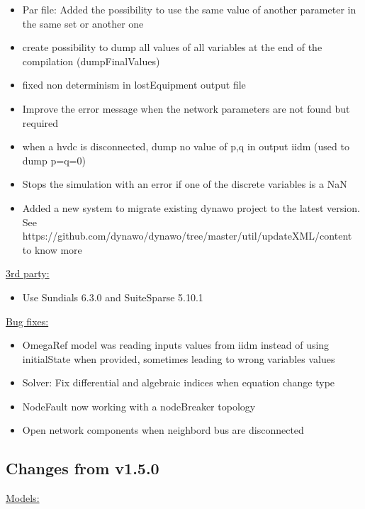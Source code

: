 \documentclass[a4paper, 12pt]{report}
\begin{document}
\begin{itemize}
\item Par file: Added the possibility to use the same value of another parameter in the same set or another one
\item create possibility to dump all values of all variables at the end of the compilation (dumpFinalValues)
\item fixed non determinism in lostEquipment output file
\item Improve the error message when the network parameters are not found but required
\item when a hvdc is disconnected, dump no value of p,q in output iidm (used to dump p=q=0)
\item Stops the simulation with an error if one of the discrete variables is a NaN
\item Added a new system to migrate existing dynawo project to the latest version. See https://github.com/dynawo/dynawo/tree/master/util/updateXML/content to know more
\end{itemize}

\underline{3rd party:}

\begin{itemize}
\item Use Sundials 6.3.0 and SuiteSparse 5.10.1
\end{itemize}

\underline{Bug fixes:}

\begin{itemize}
\item OmegaRef model was reading inputs values from iidm instead of using initialState when provided, sometimes leading to wrong variables values
\item Solver: Fix differential and algebraic indices when equation change type
\item NodeFault now working with a nodeBreaker topology
\item Open network components when neighbord bus are disconnected
\end{itemize}

\subsection{Changes from v1.5.0}

\underline{Models:}
\end{document}
